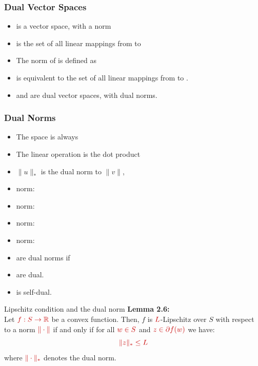 \documentclass{beamer}
\newcommand{\mathred}[1]{\textcolor{mathred}{#1}}
\begin{document}
\begin{small}
\begin{frame}
\frametitle{Dual Vector Spaces}

\begin{itemize}
\item {} is a vector space, with a norm 
\item {} is the set of all linear mappings from  to
  \item
  The norm of  is defined as
\item {} is equivalent to the set of all linear mappings from  to
  .
\item {} and  are dual vector spaces, with dual norms. 
\end{itemize}
\end{frame}

\begin{frame}
\frametitle{Dual Norms}
\begin{itemize}
  \item The space is always 
  \item The linear operation is the dot product \R{$\vu \cdot \vv$}
   \item $\|u\|_*$ is the dual norm to $\|v\|$, 
\item {} norm: 
\item {} norm: 
\item {} norm: 
\item {} norm: 
\item {} are dual norms if 
\item {} are dual.
\item {} is self-dual. 
\end{itemize}
\end{frame}

\begin{frame}{Lipschitz condition and the dual norm}
\textbf{Lemma 2.6:}\\
Let $\mathred{f:S \to \mathbb{R}}$ be a convex function. Then, $f$ is $\mathred{L}$-Lipschitz over $S$ with respect to a norm $\mathred{\|\cdot\|}$ if and only if for all $\mathred{w \in S}$ and $\mathred{z \in \partial f(w)}$ we have:
\begin{equation*}
\mathred{\|z\|_* \leq L}
\end{equation*}
where $\mathred{\|\cdot\|_*}$ denotes the dual norm.
\end{frame}


\end{small}
\end{document}
